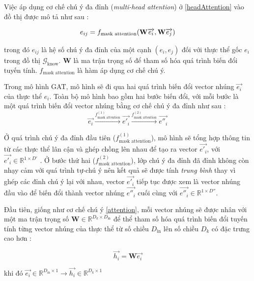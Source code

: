 Việc áp dụng cơ chế chú ý đa đỉnh (\textit{multi-head attention}) ở \ref{headAttention} vào đồ thị được mô tả như sau :

\begin{equation}
\label{maskAttention}
\centering
{e_{ij}}={f_{\text{mask attention}}(\mathbf{W} \overrightarrow{e_i}, \mathbf{W} \overrightarrow{e_j})}
\end{equation}

trong đó $e_{ij}$ là hệ số chú ý đa đỉnh của một cạnh $(e_i, e_j)$ đối với thực thể gốc $e_i$ trong đồ thị $\mathcal{G}_{\text{know}}$. $\mathbf{W}$ là ma trận trọng số để tham số hóa quá trình biến đổi tuyến tính. $f_{\text{mask attention}}$ là hàm áp dụng cơ chế chú ý.

Trong mô hình GAT, mô hình sẽ đi qua hai quá trình biến đổi vector nhúng $\overrightarrow{e_i}$ của thực thể $e_i$. Toàn bộ mô hình bao gồm hai bước biến đổi, với mỗi bước là một quá trình biến đổi vector nhúng bằng cơ chế chú ý đa đỉnh như sau :
\begin{equation}
\label{gatProcess}
\overrightarrow{e_i} \xrightarrow{f_{\text{mask attention}}^{(1)}} \overrightarrow{e'_i} \xrightarrow{f_{\text{mask attention}}^{(2)}} \overrightarrow{e''_i}
\end{equation}

Ở quá trình chú ý đa đỉnh đầu tiên ($f_{\text{mask attention}}^{(1)}$), mô hình sẽ tổng hợp thông tin từ các thực thể lân cận và ghép chồng lên nhau để tạo ra vector $\overrightarrow{e'_i}$, với $\overrightarrow{e'_i} \in \mathbb{R}^{1 \times D'}$ . Ở bước thứ hai ($f_{\text{mask attention}}^{(2)}$), lớp chú ý đa đỉnh đã đỉnh không còn nhạy cảm với quá trình tự-chú ý nên kết quả sẽ được tính \textit{trung bình} thay vì ghép các đỉnh chú ý lại với nhau, vector $\overrightarrow{e'_i}$ tiếp tục được xem là vector nhúng đầu vào để biến đổi thành vector nhúng $\overrightarrow{e''_i}$ cuối cùng với $\overrightarrow{e''_i} \in \mathbb{R}^{1 \times D''}$.

Đầu tiên, giống như cơ chế chú ý \ref{attention}, mỗi vector nhúng sẽ được nhân với một ma trận trọng số $\mathbf{W} \in \mathbb{R}^{D_k \times D_{\text{in}}}$ để thể tham số hóa quá trình biến đổi tuyến tính từng vector nhúng của thực thể từ số chiều $D_{\text{in}}$ lên số chiều $D_k$ có đặc trưng cao hơn :

\begin{equation}
\overrightarrow{h_i} = \mathbf{W} \overrightarrow{e_i}
\end{equation}

khi đó $\overrightarrow{e_i} \in \mathbb{R}^{D_{\text{in}} \times 1}
\xrightarrow{} \overrightarrow{h_i} \in \mathbb{R}^{D_k \times 1}$


